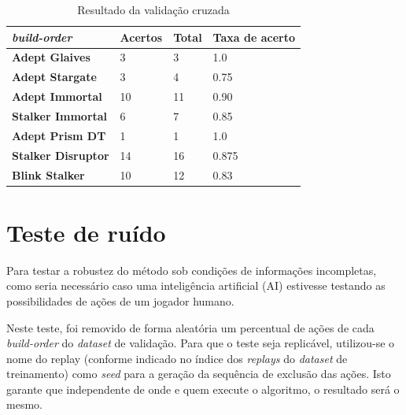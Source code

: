 \begin{table}[H]
\centering
\caption{Resultado da validação cruzada}
\label{tab:resultados-cruzada}
\begin{tabular}{llll}
\toprule
	\textit{\Gls{build-order}} 		& Acertos 	& Total & Taxa de acerto 	\\ \hline
	\textbf{Adept Glaives} 		& 3  		& 3  	& 1.0				\\
	\textbf{Adept Stargate} 		& 3  		& 4 		& 0.75				\\
	\textbf{Adept Immortal} 		& 10 		& 11 	& 0.90				\\
	\textbf{Stalker Immortal} 	& 6  		& 7  	& 0.85				\\
	\textbf{Adept Prism DT} 		& 1  		& 1  	& 1.0				\\
	\textbf{Stalker Disruptor} 	& 14  		& 16  	& 0.875				\\
	\textbf{Blink Stalker}	 	& 10  		& 12  	& 0.83				\\
\bottomrule
\end{tabular}
\end{table}

		\section{Teste de ruído}
Para testar a robustez do método sob condições de informações incompletas, como seria necessário caso uma inteligência artificial (AI) estivesse testando as possibilidades de ações de um jogador humano.

Neste teste, foi removido de forma aleatória um percentual de ações de cada \textit{\gls{build-order}} do \textit{dataset} de validação. Para que o teste seja replicável, utilizou-se o nome do \gls{replay} (conforme indicado no índice dos \textit{\glspl{replay}} do \textit{dataset} de treinamento) como \textit{seed} para a geração da sequência de exclusão das ações. Isto garante que independente de onde e quem execute o algoritmo, o resultado será o mesmo.

